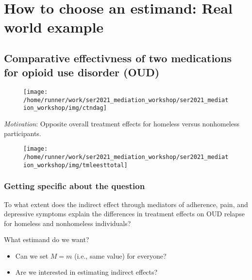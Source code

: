 \documentclass[
  12pt,
]{book}
\providecommand{\tightlist}{%
  \setlength{\itemsep}{0pt}\setlength{\parskip}{0pt}}
\theoremstyle{definition}
\theoremstyle{definition}
\theoremstyle{definition}
\newcommand{\1}{\mathbbm{1}}
\begin{document}
\hypertarget{estimandirl}{%
\chapter{How to choose an estimand: Real world example}\label{estimandirl}}

\hypertarget{comparative-effectivness-of-two-medications-for-opioid-use-disorder-oud}{%
\section{Comparative effectivness of two medications for opioid use disorder (OUD)}\label{comparative-effectivness-of-two-medications-for-opioid-use-disorder-oud}}

\begin{figure}

{\centering \texttt{[image: /home/runner/work/ser2021\_mediation\_workshop/ser2021\_mediation\_workshop/img/ctndag]} 

}

\end{figure}

\emph{Motivation}: Opposite overall treatment effects for homeless versus
nonhomeless participants.

\begin{figure}

{\centering \texttt{[image: /home/runner/work/ser2021\_mediation\_workshop/ser2021\_mediation\_workshop/img/tmleesttotal]} 

}

\end{figure}

\hypertarget{getting-specific-about-the-question}{%
\subsection{Getting specific about the question}\label{getting-specific-about-the-question}}

To what extent does the indirect effect through mediators of adherence, pain, and
depressive symptoms explain the differences in treatment effects on OUD relapse
for homeless and nonhomeless individuals?

What estimand do we want?

\begin{itemize}
\tightlist
\item
  Can we set \(M=m\) (i.e., same value) for everyone?
\item
  Are we interested in estimating indirect effects?
\end{itemize}
\end{document}
